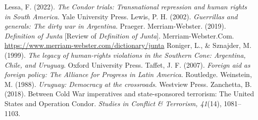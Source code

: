 \begin{referencelist}
   Lessa, F. (2022). \emph{The Condor trials: Transnational repression and human rights in South America}. Yale University Press.
   Lewis, P. H. (2002). \emph{Guerrillas and generals: The dirty war in Argentina}. Praeger.
   Merriam-Webster. (2019). \emph{Definition of Junta} [Review of \emph{Definition of Junta}]. Merriam-Webster.Com. \url{https://www.merriam-webster.com/dictionary/junta}
   Roniger, L., \& Sznajder, M. (1999). \emph{The legacy of human-rights violations in the Southern Cone: Argentina, Chile, and Uruguay}. Oxford University Press.
   Taffet, J. F. (2007). \emph{Foreign aid as foreign policy: The Alliance for Progress in Latin America}. Routledge.
   Weinstein, M. (1988). \emph{Uruguay: Democracy at the crossroads}. Westview Press.
   Zanchetta, B. (2018). Between Cold War imperatives and state-sponsored terrorism: The United States and Operation Condor. \emph{Studies in Conflict \& Terrorism, 41}(14), 1081–1103.
\end{referencelist}
